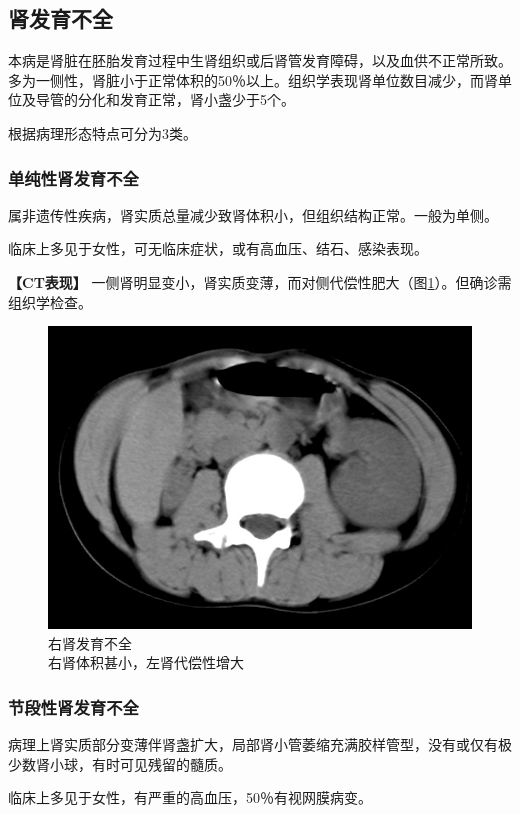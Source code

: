 \subsection{肾发育不全}

本病是肾脏在胚胎发育过程中生肾组织或后肾管发育障碍，以及血供不正常所致。多为一侧性，肾脏小于正常体积的50％以上。组织学表现肾单位数目减少，而肾单位及导管的分化和发育正常，肾小盏少于5个。

根据病理形态特点可分为3类。

\subsubsection{单纯性肾发育不全}

属非遗传性疾病，肾实质总量减少致肾体积小，但组织结构正常。一般为单侧。

临床上多见于女性，可无临床症状，或有高血压、结石、感染表现。

\textbf{【CT表现】}
一侧肾明显变小，肾实质变薄，而对侧代偿性肥大（图\ref{fig15-4}）。但确诊需组织学检查。

\begin{figure}[!htbp]
 \centering
 \includegraphics[width=.7\textwidth,height=\textheight,keepaspectratio]{./images/Image00319.jpg}
 \captionsetup{justification=centering}
 \caption{右肾发育不全\\{\small 右肾体积甚小，左肾代偿性增大}}
 \label{fig15-4}
  \end{figure} 

\subsubsection{节段性肾发育不全}

病理上肾实质部分变薄伴肾盏扩大，局部肾小管萎缩充满胶样管型，没有或仅有极少数肾小球，有时可见残留的髓质。

临床上多见于女性，有严重的高血压，50％有视网膜病变。

